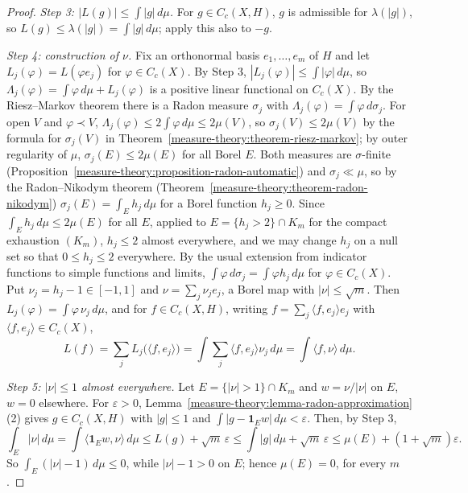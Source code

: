 \begin{proof}
\emph{Step 3: $|L(g)| \leq \int|g|\,d\mu$.} For $g \in C_c(X, H)$, $g$ is admissible for $\lambda(|g|)$, so $L(g) \leq \lambda(|g|) = \int|g|\,d\mu$; apply this also to $-g$.

\emph{Step 4: construction of $\nu$.} Fix an orthonormal basis $e_1, \ldots, e_m$ of $H$ and let $L_j(\varphi) = L(\varphi e_j)$ for $\varphi \in C_c(X)$. By Step 3, $|L_j(\varphi)| \leq \int|\varphi|\,d\mu$,
so $\Lambda_j(\varphi) = \int\varphi\,d\mu + L_j(\varphi)$ is a positive linear functional on $C_c(X)$. By the Riesz--Markov theorem there is a Radon measure $\sigma_j$ with $\Lambda_j(\varphi) = \int\varphi\,d\sigma_j$.
For open $V$ and $\varphi \prec V$, $\Lambda_j(\varphi) \leq 2\int\varphi\,d\mu \leq 2\mu(V)$, so $\sigma_j(V) \leq 2\mu(V)$ by the formula for $\sigma_j(V)$ in Theorem~\ref{measure-theory:theorem-riesz-markov}; by
outer regularity of $\mu$, $\sigma_j(E) \leq 2\mu(E)$ for all Borel $E$. Both measures are $\sigma$-finite (Proposition~\ref{measure-theory:proposition-radon-automatic}) and $\sigma_j \ll \mu$, so by the
Radon--Nikodym theorem (Theorem~\ref{measure-theory:theorem-radon-nikodym}) $\sigma_j(E) = \int_Eh_j\,d\mu$ for a Borel function $h_j \geq 0$. Since $\int_Eh_j\,d\mu \leq 2\mu(E)$ for all $E$, applied to
$E = \{h_j > 2\} \cap K_m$ for the compact exhaustion $(K_m)$, $h_j \leq 2$ almost everywhere, and we may change $h_j$ on a null set so that $0 \leq h_j \leq 2$ everywhere. By the usual extension from
indicator functions to simple functions and limits, $\int\varphi\,d\sigma_j = \int\varphi h_j\,d\mu$ for $\varphi \in C_c(X)$. Put $\nu_j = h_j - 1 \in [-1, 1]$ and $\nu = \sum_j\nu_je_j$, a Borel map with
$|\nu| \leq \sqrt m$. Then $L_j(\varphi) = \int\varphi\,\nu_j\,d\mu$, and for $f \in C_c(X, H)$, writing $f = \sum_j\langle f, e_j\rangle e_j$ with $\langle f, e_j\rangle \in C_c(X)$,
\[
L(f) = \sum_jL_j\bigl(\langle f, e_j\rangle\bigr) = \int\sum_j\langle f, e_j\rangle\nu_j\,d\mu = \int\langle f, \nu\rangle\,d\mu .
\]

\emph{Step 5: $|\nu| \leq 1$ almost everywhere.} Let $E = \{|\nu| > 1\} \cap K_m$ and $w = \nu/|\nu|$ on $E$, $w = 0$ elsewhere. For $\varepsilon > 0$, Lemma~\ref{measure-theory:lemma-radon-approximation}(2) gives
$g \in C_c(X, H)$ with $|g| \leq 1$ and $\int|g - \mathbf{1}_Ew|\,d\mu < \varepsilon$. Then, by Step 3,
\[
\int_E|\nu|\,d\mu = \int\langle\mathbf{1}_Ew, \nu\rangle\,d\mu \leq L(g) + \sqrt m\,\varepsilon \leq \int|g|\,d\mu + \sqrt m\,\varepsilon \leq \mu(E) + (1 + \sqrt m)\varepsilon .
\]
So $\int_E(|\nu| - 1)\,d\mu \leq 0$, while $|\nu| - 1 > 0$ on $E$; hence $\mu(E) = 0$, for every $m$.


\end{proof}
